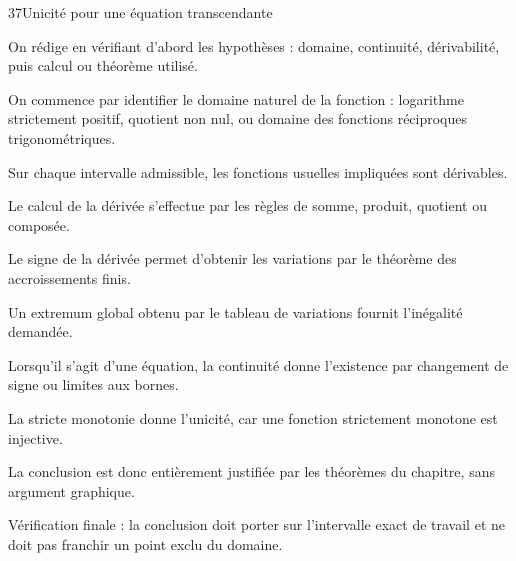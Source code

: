 \documentclass[11pt,a4paper]{article}
\begin{document}
\begin{corrbox}{37}{Unicité pour une équation transcendante}

\begin{methodebox}
On rédige en vérifiant d'abord les hypothèses : domaine, continuité, dérivabilité, puis calcul ou théorème utilisé.
\end{methodebox}

On commence par identifier le domaine naturel de la fonction : logarithme strictement positif, quotient non nul, ou domaine des fonctions réciproques trigonométriques.


Sur chaque intervalle admissible, les fonctions usuelles impliquées sont dérivables.


Le calcul de la dérivée s'effectue par les règles de somme, produit, quotient ou composée.


Le signe de la dérivée permet d'obtenir les variations par le théorème des accroissements finis.


Un extremum global obtenu par le tableau de variations fournit l'inégalité demandée.


Lorsqu'il s'agit d'une équation, la continuité donne l'existence par changement de signe ou limites aux bornes.


La stricte monotonie donne l'unicité, car une fonction strictement monotone est injective.


La conclusion est donc entièrement justifiée par les théorèmes du chapitre, sans argument graphique.


\begin{attentionbox}
Vérification finale : la conclusion doit porter sur l'intervalle exact de travail et ne doit pas franchir un point exclu du domaine.
\end{attentionbox}

\end{corrbox}
\end{document}
